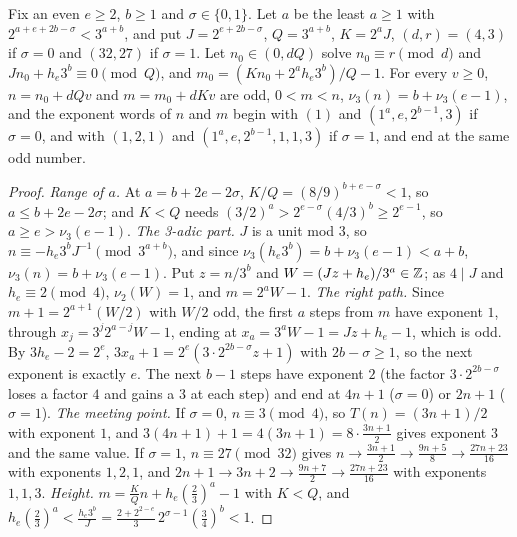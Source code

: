 \begin{theorem}\label{thm:merge}
Fix an even $e\ge2$, $b\ge1$ and $\sigma\in\{0,1\}$. Let $a$ be the least $a\ge1$ with $2^{a+e+2b-\sigma}<3^{a+b}$, and put $J=2^{e+2b-\sigma}$, $Q=3^{a+b}$, $K=2^aJ$, $(d,r)=(4,3)$ if $\sigma=0$ and $(32,27)$ if $\sigma=1$. Let $n_0\in(0,dQ)$ solve $n_0\equiv r\pmod d$ and $Jn_0+h_e3^b\equiv0\pmod Q$, and $m_0=(Kn_0+2^ah_e3^b)/Q-1$. For every $v\ge0$, $n=n_0+dQv$ and $m=m_0+dKv$ are odd, $0<m<n$, $\nu_3(n)=b+\nu_3(e-1)$, and the exponent words of $n$ and $m$ begin with $(1)$ and $(1^a,e,2^{b-1},3)$ if $\sigma=0$, and with $(1,2,1)$ and $(1^a,e,2^{b-1},1,1,3)$ if $\sigma=1$, and end at the same odd number.
\end{theorem}

\begin{proof}
\emph{Range of $a$.} At $a=b+2e-2\sigma$, $K/Q=(8/9)^{b+e-\sigma}<1$, so $a\le b+2e-2\sigma$; and $K<Q$ needs $(3/2)^a>2^{e-\sigma}(4/3)^b\ge2^{e-1}$, so $a\ge e>\nu_3(e-1)$.
\emph{The 3-adic part.} $J$ is a unit mod $3$, so $n\equiv-h_e3^bJ^{-1}\pmod{3^{a+b}}$, and since $\nu_3(h_e3^b)=b+\nu_3(e-1)<a+b$, $\nu_3(n)=b+\nu_3(e-1)$. Put $z=n/3^b$ and $W=(Jz+h_e)/3^a\in\mathbb{Z}$; as $4\mid J$ and $h_e\equiv2\pmod4$, $\nu_2(W)=1$, and $m=2^aW-1$.
\emph{The right path.} Since $m+1=2^{a+1}(W/2)$ with $W/2$ odd, the first $a$ steps from $m$ have exponent $1$, through $x_j=3^j2^{a-j}W-1$, ending at $x_a=3^aW-1=Jz+h_e-1$, which is odd. By $3h_e-2=2^e$, $3x_a+1=2^e(3\cdot2^{2b-\sigma}z+1)$ with $2b-\sigma\ge1$, so the next exponent is exactly $e$. The next $b-1$ steps have exponent $2$ (the factor $3\cdot2^{2b-\sigma}$ loses a factor $4$ and gains a $3$ at each step) and end at $4n+1$ ($\sigma=0$) or $2n+1$ ($\sigma=1$).
\emph{The meeting point.} If $\sigma=0$, $n\equiv3\pmod4$, so $T(n)=(3n+1)/2$ with exponent $1$, and $3(4n+1)+1=4(3n+1)=8\cdot\frac{3n+1}2$ gives exponent $3$ and the same value. If $\sigma=1$, $n\equiv27\pmod{32}$ gives $n\to\frac{3n+1}2\to\frac{9n+5}8\to\frac{27n+23}{16}$ with exponents $1,2,1$, and $2n+1\to3n+2\to\frac{9n+7}2\to\frac{27n+23}{16}$ with exponents $1,1,3$.
\emph{Height.} $m=\frac KQn+h_e(\frac23)^a-1$ with $K<Q$, and $h_e(\frac23)^a<\frac{h_e3^b}J=\frac{2+2^{2-e}}3\,2^{\sigma-1}(\frac34)^b<1$.
\end{proof}


